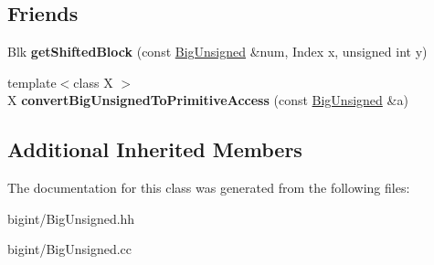 \subsection*{Friends}
\begin{DoxyCompactItemize}
\item 
\mbox{\label{class_big_unsigned_a071e047bb0c201c2efe2867378a03a2c}} 
Blk {\bfseries get\+Shifted\+Block} (const \mbox{\hyperlink{class_big_unsigned}{Big\+Unsigned}} \&num, Index x, unsigned int y)
\item 
\mbox{\label{class_big_unsigned_a96741d68d18c9847cc65eeb8761d7497}} 
{\footnotesize template$<$class X $>$ }\\X {\bfseries convert\+Big\+Unsigned\+To\+Primitive\+Access} (const \mbox{\hyperlink{class_big_unsigned}{Big\+Unsigned}} \&a)
\end{DoxyCompactItemize}
\subsection*{Additional Inherited Members}


The documentation for this class was generated from the following files\+:\begin{DoxyCompactItemize}
\item 
bigint/Big\+Unsigned.\+hh\item 
bigint/Big\+Unsigned.\+cc\end{DoxyCompactItemize}

